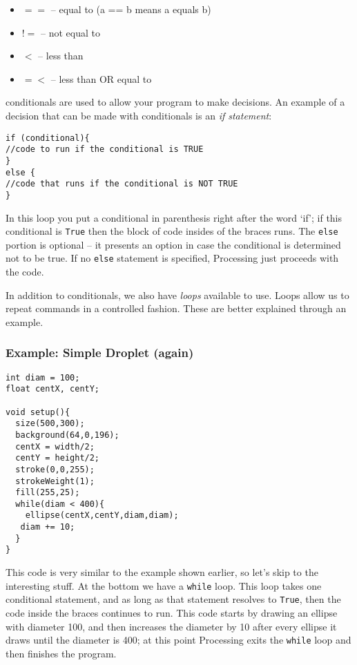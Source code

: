 \begin{itemize}
\item $==$ -- equal to (a == b means a equals b)
\item $!=$ -- not equal to
\item $<$ -- less than
\item $=<$ -- less than OR equal to
\end{itemize}

conditionals are used to allow your program to make decisions.  An example of a decision that can be made with conditionals is an \emph{if statement}:

\begin{verbatim}
if (conditional){
//code to run if the conditional is TRUE
}
else {
//code that runs if the conditional is NOT TRUE
}
\end{verbatim}

In this loop you put a conditional in parenthesis right after the word `if'; if this conditional is \texttt{True} then the block of code insides of the braces runs.  The \texttt{else} portion is optional -- it presents an option in case the conditional is determined not to be true.  If no \texttt{else} statement is specified, Processing just proceeds with the code.

In addition to conditionals, we also have \emph{loops} available to use.  Loops allow us to repeat commands in a controlled fashion.  These are better explained through an example.

\subsubsection{Example: Simple Droplet (again)}
\begin{verbatim}
int diam = 100;
float centX, centY;

void setup(){
  size(500,300);
  background(64,0,196);
  centX = width/2;
  centY = height/2;
  stroke(0,0,255);
  strokeWeight(1);
  fill(255,25);
  while(diam < 400){
    ellipse(centX,centY,diam,diam);
   diam += 10; 
  }
}
\end{verbatim}

This code is very similar to the example shown earlier, so let's skip to the interesting stuff.  At the bottom we have a \texttt{while} loop.  This loop takes one conditional statement, and as long as that statement resolves to \texttt{True}, then the code inside the braces continues to run.  This code starts by drawing an ellipse with diameter 100, and then increases the diameter by 10 after every ellipse it draws until the diameter is 400; at this point Processing exits the \texttt{while} loop and then finishes the program.

